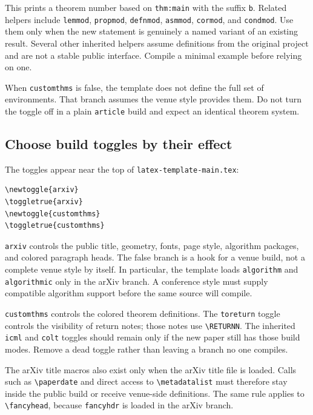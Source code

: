 This prints a theorem number based on \texttt{thm:main} with the suffix
\texttt{b}. Related helpers include \texttt{lemmod}, \texttt{propmod},
\texttt{defnmod}, \texttt{asmmod}, \texttt{cormod}, and \texttt{condmod}.
Use them only when the new statement is genuinely a named variant of an
existing result. Several other inherited helpers assume definitions from the
original project and are not a stable public interface. Compile a minimal
example before relying on one.

When \texttt{customthms} is false, the template does not define the full set of
environments. That branch assumes the venue style provides them. Do not turn
the toggle off in a plain \texttt{article} build and expect an identical
theorem system.

\subsection{Choose build toggles by their effect}

The toggles appear near the top of \texttt{latex-template-main.tex}:

\begin{verbatim}
\newtoggle{arxiv}
\toggletrue{arxiv}
\newtoggle{customthms}
\toggletrue{customthms}
\end{verbatim}

\texttt{arxiv} controls the public title, geometry, fonts, page style,
algorithm packages, and colored paragraph heads. The false branch is a hook
for a venue build, not a complete venue style by itself. In particular, the
template loads \texttt{algorithm} and \texttt{algorithmic} only in the arXiv
branch. A conference style must supply compatible algorithm support before
the same source will compile.

\texttt{customthms} controls the colored theorem definitions. The
\texttt{toreturn} toggle controls the visibility of return notes; those
notes use \texttt{\textbackslash RETURNN}. The inherited \texttt{icml} and
\texttt{colt} toggles should remain only if the new paper still has those
build modes. Remove a dead toggle rather than leaving a branch no one compiles.

The arXiv title macros also exist only when the arXiv title file is loaded.
Calls such as \texttt{\textbackslash paperdate} and direct access to
\texttt{\textbackslash metadatalist} must therefore stay inside the public
build or receive venue-side definitions. The same rule applies to
\texttt{\textbackslash fancyhead}, because \texttt{fancyhdr} is loaded in the
arXiv branch.

